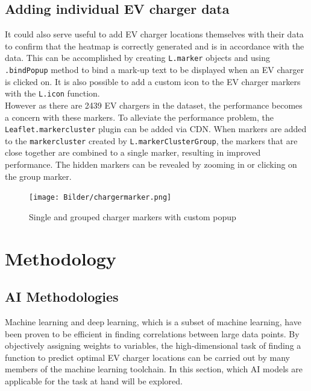 \subsection{Adding individual EV charger data}
It could also serve useful to add EV charger locations themselves with their data to confirm that the heatmap is correctly generated and is in accordance with the data. This can be accomplished by creating \verb|L.marker| objects and using \verb|.bindPopup| method to bind a mark-up text to be displayed when an EV charger is clicked on. It is also possible to add a custom icon to the EV charger markers with the \verb|L.icon| function. \\
However as there are 2439 EV chargers in the dataset, the performance becomes a concern with these markers. To alleviate the performance problem, the \verb|Leaflet.markercluster|\cite{markeclusterdocs} plugin can be added via CDN. When markers are added to the \verb|markercluster| created by \verb|L.markerClusterGroup|, the markers that are close together are combined to a single marker, resulting in improved performance. The hidden markers can be revealed by zooming in or clicking on the group marker.\\
\begin{figure}[hbt!]
\begin{center}
\texttt{[image: Bilder/chargermarker.png]}
\caption{Single and grouped charger markers with custom popup}\label{fig:chargermarker}
\end{center}
\end{figure}
\section{Methodology}
\subsection{AI Methodologies}
Machine learning and deep learning, which is a subset of machine learning, have been proven to be efficient in finding correlations between large data points. By objectively assigning weights to variables, the high-dimensional task of finding a function to predict optimal EV charger locations can be carried out by many members of the machine learning toolchain.\cite{deploymentproblem} In this section, which AI models are applicable for the task at hand will be explored.
